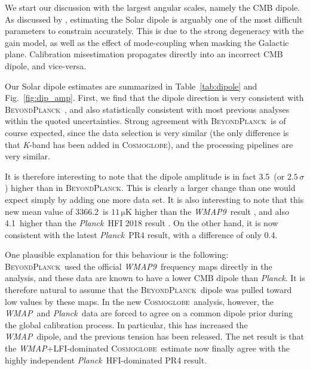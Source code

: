 \documentclass[twocolumn]{../../common/aa}
\def\WMAP{\emph{WMAP}}
\def\WMAPnine{\emph{WMAP9}}
\def\Planck{\emph{Planck}}
\newcommand{\BP}{\textsc{BeyondPlanck}}
\newcommand{\bp}{\textsc{BeyondPlanck}}
\newcommand{\cosmoglobe}{\textsc{Cosmoglobe}}
\newcommand{\K}[0]{\textit K}
\begin{document}
We start our discussion with the largest angular scales, namely the CMB dipole. As discussed by \citet{thommesen:2019}, estimating the Solar dipole is arguably one of the most difficult parameters to constrain accurately. This is due to the strong degeneracy with the gain model, as well as the effect of mode-coupling when masking the Galactic plane. Calibration misestimation propagates directly into an incorrect CMB dipole, and vice-versa.

Our Solar dipole estimates are summarized in Table~\ref{tab:dipole} and Fig.~\ref{fig:dip_amp}. First, we find that the dipole direction is very consistent with \bp\ \citep{bp11}, and also statistically consistent with most previous analyses within the quoted uncertainties. Strong agreement with \bp\ is of course expected, since the data selection is very similar (the only difference is that \K-band has been added in \cosmoglobe), and the processing pipelines are very similar.

It is therefore interesting to note that the dipole amplitude is in fact 3.5\muK\ (or $2.5\,\sigma$) higher than in \bp. This is clearly a larger change than one would expect simply by adding one more data set. It is also interesting to note that this new mean value of 3366.2\muK\ is $11\,\mathrm{\mu K}$ higher than the \WMAPnine\ result \citep{hinshaw2009}, and also 4.1\muK\ higher than the \Planck\ HFI 2018 result \citep{planck2016-l02}. On the other hand, it is now consistent with the latest \Planck\ PR4 result, with a difference of only 0.4\muK.


One plausible explanation for this behaviour is the following: \bp\ used the official \WMAPnine\ frequency maps directly in the analysis, and these data are known to have a lower CMB dipole than \Planck. It is therefore natural to assume that the \BP\ dipole was pulled toward low values by these maps. In the new \cosmoglobe\ analysis, however, the \WMAP\ and \Planck\ data are forced to agree on a common dipole prior during the global calibration process. In particular, this has increased the \WMAP\ dipole, and the previous tension has been released. The net result is that the \WMAP+LFI-dominated \cosmoglobe\ estimate now finally agree with the highly independent \Planck\ HFI-dominated PR4 result. 

\end{document}
